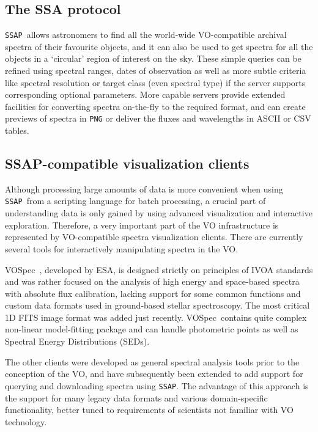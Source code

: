 \documentclass[final,authoryear,5p,times,twocolumn]{elsarticle}
\newcommand{\ssap}{\texttt{SSAP}}
\newcommand{\vospec}{\textsf{\small VOSpec}}
\newcommand{\ascl}[1]{\href{http://www.ascl.net/#1}{ascl:#1}}
\begin{document}
\subsection{The SSA protocol}
%
\ssap\ allows astronomers to find all the world-wide VO-compatible archival
spectra of their favourite objects, and it can also be used to get spectra for
all the objects in a `circular' region of interest on the sky. These simple
queries can be refined using spectral ranges, dates of observation as well as
more subtle criteria like spectral resolution or target class (even spectral
type) if the server supports corresponding optional parameters. More capable
servers provide extended facilities for converting spectra on-the-fly to the
required format, and can create previews of spectra in \texttt{PNG} or deliver
the fluxes and wavelengths in ASCII or CSV tables.

\subsection{SSAP-compatible visualization clients}
%
Although processing large amounts of data is more convenient when using \ssap\
from a scripting language for batch processing, a crucial part of understanding
data is only gained by using advanced visualization and interactive
exploration.  Therefore, a very important part of the VO infrastructure is
represented by VO-compatible spectra visualization clients. There are currently
several tools for interactively manipulating spectra in the VO.

\vospec\ \citep[][\ascl{1205.011}]{2005ASPC..347..198O}, developed by ESA, is
designed strictly on principles of IVOA standards and was rather focused on
the analysis of high energy and space-based spectra with absolute flux
calibration, lacking support for some common functions and custom data formats
used in ground-based stellar spectroscopy. The most critical 1D FITS image
format was added just recently. \vospec\ contains quite complex non-linear
model-fitting package and can handle photometric points as well as Spectral
Energy Distributions (SEDs).

The other clients were developed as general spectral analysis tools prior to
the conception of the VO, and have subsequently been extended to add support
for querying and downloading spectra using \ssap.  The advantage of this
approach is the support for many legacy data formats and various
domain-specific functionality, better tuned to requirements of scientists not
familiar with VO technology.
\end{document}
